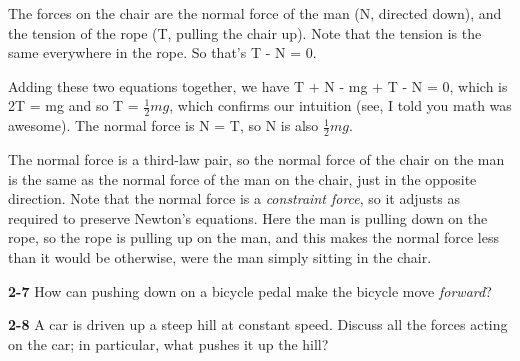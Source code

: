 \documentclass{amsart}
\begin{document}
The forces on the chair are the normal force of the man (N, directed down), and the tension 
of the rope (T, pulling the chair up).
Note that the tension is the same everywhere in the rope.  So that's T - N = 0.

Adding these two equations together, we have T + N - mg + T - N = 0, which is 2T = mg and so T = $\frac{1}{2} mg$,
which confirms our intuition (see, I told you math was awesome).  The normal force is N = T, so N is also $\frac{1}{2} mg$.

The normal force is a third-law pair, so the normal force of the chair on the man is the same as the normal force
of the man on the chair, just in the opposite direction.  Note that the normal force is a \textit{constraint force}, 
so it adjusts as required to preserve Newton's equations.  
Here the man is pulling down on the rope, so the rope is pulling up on the man, and this makes the normal force less 
than it would be otherwise, were the man simply sitting in the chair.

\vspace{\baselineskip}

\noindent
\textbf{2-7} How can pushing down on a bicycle pedal make the bicycle move \textit{forward}?

\vspace{\baselineskip}

\noindent
\textbf{2-8} A car is driven up a steep hill at constant speed.
Discuss all the forces acting on the car; in particular, what pushes it up the hill?
\end{document}
